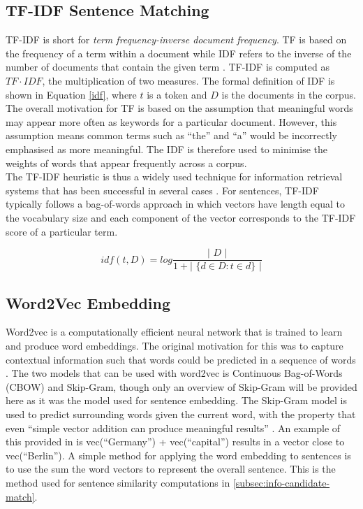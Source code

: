 \subsection{TF-IDF Sentence Matching}
\label{subsec:info-tfidf}
TF-IDF is short for \textit{term frequency-inverse document frequency}. TF is based on the frequency of a term within a document while IDF refers to the inverse of the number of documents that contain the given term \cite{robertson2004understanding}. TF-IDF is computed as $TF\cdot IDF$, the multiplication of two measures. The formal definition of IDF is shown in Equation \ref{idf}, where $t$ is a token and $D$ is the documents in the corpus. The overall motivation for TF is based on the assumption that meaningful words may appear more often as keywords for a particular document. However, this assumption means common terms such as ``the'' and ``a'' would be incorrectly emphasised as more meaningful. The IDF is therefore used to minimise the weights of words that appear frequently across a corpus. \\
The TF-IDF heuristic is thus a widely used technique for information retrieval systems that has been successful in several cases \cite{tfidf-explain}. For sentences, TF-IDF typically follows a bag-of-words approach in which vectors have length equal to the vocabulary size and each component of the vector corresponds to the TF-IDF score of a particular term.

\begin{equation}
\label{idf}
idf( t, D ) = log \frac{ \text{| } D \text{ |} }{ 1 + \text{| } \{ d \in D : t \in d \} \text{ |} }
\end{equation}

\subsection{Word2Vec Embedding}
\label{subsec:info-w2v}
Word2vec is a computationally efficient neural network that is trained to learn and produce word embeddings. The original motivation for this was to capture contextual information such that words could be predicted in a sequence of words \cite{mikolov2013efficient}. The two models that can be used with word2vec is Continuous Bag-of-Words (CBOW) and Skip-Gram, though only an overview of Skip-Gram will be provided here as it was the model used for sentence embedding. The Skip-Gram model is used to predict surrounding words given the current word, with the property that even ``simple vector addition can produce meaningful results'' \cite{mikolov2013distributed}. An example of this provided in \cite{mikolov2013distributed} is vec(``Germany'') + vec(``capital'') results in a vector close to vec(``Berlin''). A simple method for applying the word embedding to sentences is to use the sum the word vectors to represent the overall sentence. This is the method used for sentence similarity computations in \ref{subsec:info-candidate-match}.

